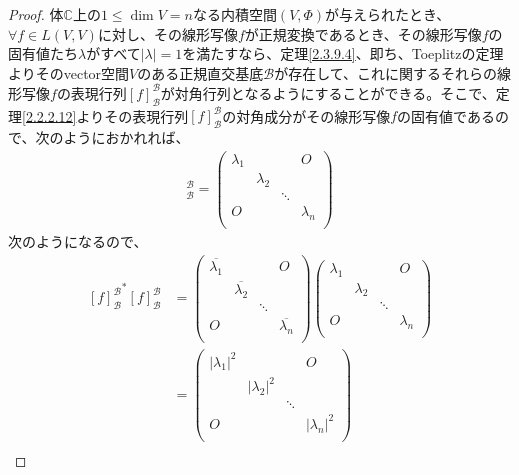 \documentclass[dvipdfmx]{jsarticle}
\begin{document}
\begin{proof}
体$\mathbb{C}$上の$1 \leq \dim V = n$なる内積空間$(V,\varPhi)$が与えられたとき、$\forall f \in L(V,V)$に対し、その線形写像$f$が正規変換であるとき、その線形写像$f$の固有値たち$\lambda$がすべて$|\lambda| = 1$を満たすなら、定理\ref{2.3.9.4}、即ち、Toeplitzの定理よりそのvector空間$V$のある正規直交基底$\mathcal{B}$が存在して、これに関するそれらの線形写像$f$の表現行列$[ f]_{\mathcal{B}}^{\mathcal{B}}$が対角行列となるようにすることができる。そこで、定理\ref{2.2.2.12}よりその表現行列$[ f]_{\mathcal{B}}^{\mathcal{B}}$の対角成分がその線形写像$f$の固有値であるので、次のようにおかれれば、
\begin{align*}
[ f]_{\mathcal{B}}^{\mathcal{B}} = \begin{pmatrix}
\lambda_{1} & \  & \  & O \\
\  & \lambda_{2} & \  & \  \\
\  & \  & \ddots & \  \\
O & \  & \  & \lambda_{n} \\
\end{pmatrix}
\end{align*}
次のようになるので、
\begin{align*}
{[ f]_{\mathcal{B}}^{\mathcal{B}}}^{*}[ f]_{\mathcal{B}}^{\mathcal{B}} &= \begin{pmatrix}
\overline{\lambda_{1}} & \  & \  & O \\
\  & \overline{\lambda_{2}} & \  & \  \\
\  & \  & \ddots & \  \\
O & \  & \  & \overline{\lambda_{n}} \\
\end{pmatrix}\begin{pmatrix}
\lambda_{1} & \  & \  & O \\
\  & \lambda_{2} & \  & \  \\
\  & \  & \ddots & \  \\
O & \  & \  & \lambda_{n} \\
\end{pmatrix}\\
&= \begin{pmatrix}
\left| \lambda_{1} \right|^{2} & \  & \  & O \\
\  & \left| \lambda_{2} \right|^{2} & \  & \  \\
\  & \  & \ddots & \  \\
O & \  & \  & \left| \lambda_{n} \right|^{2} \\
\end{pmatrix}\\

\end{align*}
\end{proof}
\end{document}
